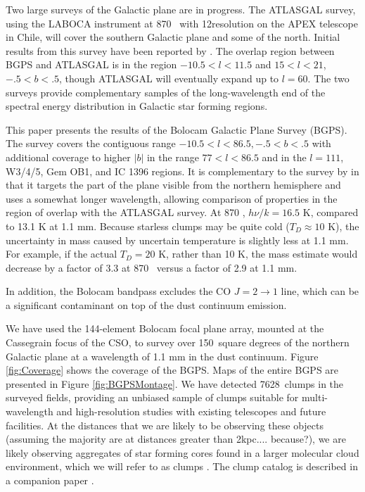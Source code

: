 \documentclass[12pt,preprint]{aastex}
\newcommand{\td}{\mbox{$T_D$}}
\newcommand{\jj}[2]{\mbox{$J = #1\rightarrow#2$}}
\newcommand{\lon}{\ensuremath{l}}
\def\bgps{BGPS}
\newcommand{\bgpsarea}{150}
\newcommand{\ncores}{7628}
\begin{document}
Two large surveys of the Galactic plane are in progress.  The ATLASGAL survey,
using the LABOCA instrument at 870 \micron\  with 12\arcsec resolution on the
APEX telescope in Chile, will cover the southern Galactic plane and some of the
north.  Initial results from this survey have been reported by
\citet{schuller09}. The overlap region between BGPS and ATLASGAL is in the
region $-10.5 < \lon < 11.5$ and $15 < \lon < 21$, $-.5 < b < .5$, though
ATLASGAL will eventually expand up to $\lon = 60$.  The two surveys provide
complementary samples of the long-wavelength end of the spectral energy
distribution in Galactic star forming regions.  



This paper presents the results of the Bolocam Galactic Plane Survey (BGPS).
The survey covers the contiguous range $-10.5 < \lon < 86.5, -.5 < b < .5$ with
additional coverage to higher $|b|$ in the range $77 < \lon < 86.5$ and in the
$\lon=111$, W3/4/5, Gem OB1, and IC 1396 regions.  It is complementary to the
survey by \citet{schuller09} in that it targets the part of the plane visible
from the northern hemisphere and uses a somewhat longer wavelength, allowing
comparison of properties in the region of overlap with the ATLASGAL survey.
At 870 \micron, $h\nu/k = 16.5$ K, compared to 13.1 K at 1.1 mm.  Because
starless clumps may be quite cold ($\td \approx 10$ K), the uncertainty in mass
caused by uncertain temperature is slightly less at 1.1 mm.  For example, 
if the actual $\td = 20$ K, rather than 10 K, the mass estimate would decrease by a
factor of 3.3 at 870 \micron\ versus a factor of 2.9 at 1.1 mm. 

In addition,
the Bolocam bandpass excludes the CO \jj{2}{1} line, which can be a significant
contaminant on top of the dust continuum emission.

We have used the 144-element Bolocam focal plane array, mounted at the
Cassegrain focus of the CSO, to survey over \bgpsarea\
square degrees of the northern Galactic plane at a wavelength of 1.1
mm in the dust continuum.  Figure \ref{fig:Coverage} shows the
coverage of the \bgps.  Maps of the entire BGPS are presented in
Figure \ref{fig:BGPSMontage}.  We have detected \ncores\ clumps in the
surveyed fields, providing an unbiased sample of clumps suitable for
multi-wavelength and high-resolution studies with existing telescopes and
future facilities.  At the distances that we are likely to be observing these
objects (assuming the majority are at distances greater than 2kpc....
because?), we are likely observing aggregates of star forming cores found in a
larger molecular cloud environment, which we will refer to as clumps
\citep{williams00}.  The clump catalog is described in a companion paper
\citep{rosolowsky09}.
\end{document}

